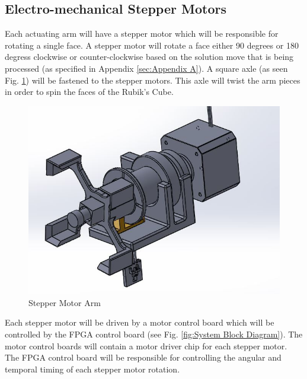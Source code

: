 \documentclass[11pt,english]{article}
\begin{document}
\subsection{Electro-mechanical Stepper Motors}
\label{sec:Stepper Motors}
Each actuating arm will have a stepper motor which will be responsible for rotating a single face. A stepper motor will rotate a face either 90 degrees or 180 degress clockwise or counter-clockwise based on the solution move that is being processed (as specified in Appendix \ref{sec:Appendix A}). A square axle (as seen Fig. \ref{fig:Stepper Motor Arm}) will be fastened to the stepper motors. This axle will twist the arm pieces in order to spin the faces of the Rubik's Cube.

\begin{figure}[!ht]
\centering
\includegraphics[scale=0.5]{StepperMotorArm.jpg}
\caption{Stepper Motor Arm}
\label{fig:Stepper Motor Arm}
\end{figure}

Each stepper motor will be driven by a motor control board which will be controlled by the FPGA control board (see Fig. \ref{fig:System Block Diagram}). The motor control boards will contain a motor driver chip for each stepper motor. The FPGA control board will be responsible for controlling the angular and temporal timing of each stepper motor rotation.
\end{document}
